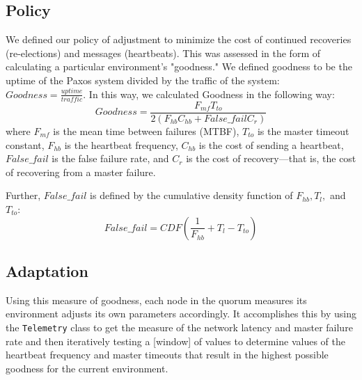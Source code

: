 \subsection{Policy}
We defined our policy of adjustment to minimize the cost of continued recoveries (re-elections) and messages (heartbeats).  This was assessed in the form of calculating a particular environment's "goodness."  We defined goodness to be the uptime of the Paxos system divided by the traffic of the system: $Goodness = \frac{uptime}{traffic}$.  In this way, we calculated Goodness in the following way:
\begin{equation}
	Goodness = \frac
	{F_{mf}  T_{to}}
	{2 (F_{hb}C_{hb} + False\_fail C_r)}
\end{equation}
where $F_{mf}$ is the mean time between failures (MTBF), $T_{to}$ is the master timeout constant, $F_{hb}$ is the heartbeat frequency, $C_{hb}$ is the cost of sending a heartbeat, $False\_fail$ is the false failure rate, and $C_r$ is the cost of recovery---that is, the cost of recovering from a master failure.

Further, $False\_fail$ is defined by the cumulative density function of $F_{hb}, T_l,$ and $T_{to}$:
\begin{equation}
	False\_fail = CDF ( \frac{1}{F_{hb}} + T_l - T_{to} )
\end{equation}

\subsection{Adaptation}
Using this measure of goodness, each node in the quorum measures its environment adjusts its own parameters accordingly.  It accomplishes this by using the \texttt{Telemetry} class to get the measure of the network latency and master failure rate and then iteratively testing a [window] of values to determine values of the heartbeat frequency and master timeouts that result in the highest possible goodness for the current environment.

